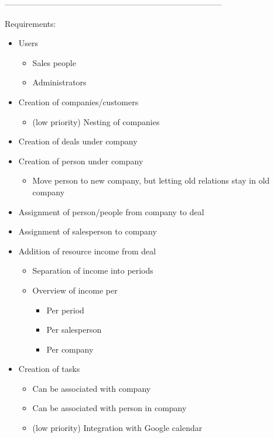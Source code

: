 --------------------------------------------------------------------------------

Requirements:
\begin{itemize}
  \item Users
  \begin{itemize}
    \item Sales people
    \item Administrators
  \end{itemize}
  \item Creation of companies/customers
  \begin{itemize}
    \item (low priority) Nesting of companies
  \end{itemize}
  \item Creation of deals under company
  \item Creation of person under company
  \begin{itemize}
    \item Move person to new company, but letting old relations stay in old company
  \end{itemize}
  \item Assignment of person/people from company to deal
  \item Assignment of salesperson to company
  \item Addition of resource income from deal
  \begin{itemize}
    \item Separation of income into periods
    \item Overview of income per
    \begin{itemize}
      \item Per period
      \item Per salesperson
      \item Per company
    \end{itemize}
  \end{itemize}
  \item Creation of tasks
  \begin{itemize}
    \item Can be associated with company
    \item Can be associated with person in company
    \item (low priority) Integration with Google calendar
  \end{itemize}
\end{itemize}
